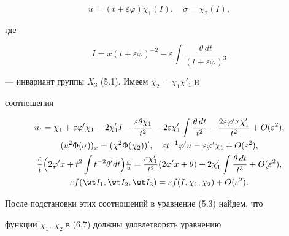 \begin{equation} 


u=(t+\varepsilon\varphi)\chi_1(I),\quad 


\sigma=\chi_2(I),\tag{6.7} 


\end{equation} 


где 


$$ 


I=x(t+\varepsilon\varphi)^{-2}-\varepsilon\int 


\frac{\theta\,dt}{(t+\varepsilon\varphi)^3} 


$$ 


--- инвариант группы $X_3$ (5.1). Имеем $\chi_2=\chi_1\chi'_1$ и 


соотношения 


\begin{gather*} 


u_t=\chi_1+\varepsilon \varphi'\chi_1-2\chi'_1I- 


\frac{\varepsilon\theta\chi_1}{t^2}-2\varepsilon\chi'_1 


\int\frac{\theta\,dt}{t^2}- 


\frac{2\varepsilon\varphi' x\chi'_1}{t^2}+O(\varepsilon^2),\\ 


% 


(u^2\Phi(\sigma))_x=(\chi^2_1\Phi(\chi_2))',\quad 


\varepsilon t^{-1}\varphi'u=\varepsilon\varphi'\chi_1+ 


O(\varepsilon^2),\\ 


% 


\frac{\varepsilon}{t}\Big(2\varphi'x+t^2\int t^{-2}\theta'dt\Big) 


\tfrac{\sigma}{u}=\frac{\varepsilon\chi'_1}{t^2} 


(2\varphi'x+\theta)+2\chi'_1\int\frac{\theta\,dt}{t^3}+ 


O(\varepsilon^2),\\ 


% 


\varepsilon f(\wt I_1,\wt I_2,\wt I_3)=\varepsilon 


f(I,\chi_1,\chi_2)+O(\varepsilon^2). 


\end{gather*} 


После подстановки этих соотношений в уравнение (5.3) найдем, что 


функции $\chi_1$, $\chi_2$ в (6.7) должны удовлетворять уравнению 


